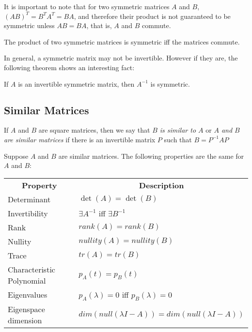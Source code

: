\documentclass{report}
\begin{document}
		It is important to note that for two symmetric matrices $A$ and $B$, $(AB)^T=B^TA^T=BA$, and therefore their product is not guaranteed to be symmetric unless $AB=BA$, that is, $A$ and $B$ commute.
		
		\begin{thm}
			The product of two symmetric matrices is symmetric iff the matrices commute.
		\end{thm}
		
		In general, a symmetric matrix may not be invertible. However if they are, the following theorem shows an interesting fact:
		
		\begin{thm}
			If $A$ is an invertible symmetric matrix, then $A^{-1}$ is symmetric.
		\end{thm}
		
		\subsection{Similar Matrices}
		\begin{defn}
			If $A$ and $B$ are square matrices, then we say that \emph{$B$ is similar to $A$} or \emph{$A$ and $B$ are similar matrices} if there is an invertible matrix $P$ such that $B=P^{-1}AP$
		\end{defn}
		
		\begin{thm}
			Suppose $A$ and $B$ are similar matrices. The following properties are the same for $A$ and $B$: \\
			\begin{tabular}{ll}
				\multicolumn{1}{c}{\textbf{Property}} & \multicolumn{1}{c}{\textbf{Description}}             \\
				Determinant                           & $\det(A)=\det(B)$                                    \\
				Invertibility                         & $\exists A^{-1}$ iff $\exists B^{-1}$                \\
				Rank                                  & $rank(A)=rank(B)$                                    \\
				Nullity                               & $nullity(A)=nullity(B)$                              \\
				Trace                                 & $tr(A)=tr(B)$                                        \\
				Characteristic Polynomial             & $p_A(t)=p_B(t)$                                      \\
				Eigenvalues                           & $p_A(\lambda)=0$ iff $p_B(\lambda)=0$                \\
				Eigenspace dimension                  & $dim(null(\lambda I-A))=dim(null(\lambda I-A))$
			\end{tabular}
		\end{thm}
		
\end{document}
